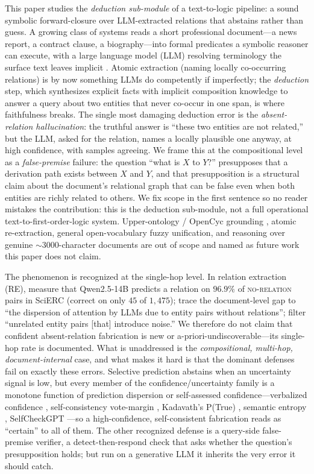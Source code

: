 \documentclass[11pt,letterpaper]{article}
\begin{document}
This paper studies the \emph{deduction sub-module} of a text-to-logic pipeline: a sound symbolic forward-closure over LLM-extracted relations that abstains rather than guess. A growing class of systems reads a short professional document---a news report, a contract clause, a biography---into formal predicates a symbolic reasoner can execute, with a large language model (LLM) resolving terminology the surface text leaves implicit \citep{Pan2023, Olausson2023}. Atomic extraction (naming locally co-occurring relations) is by now something LLMs do competently if imperfectly; the \emph{deduction} step, which synthesizes explicit facts with implicit composition knowledge to answer a query about two entities that never co-occur in one span, is where faithfulness breaks. The single most damaging deduction error is the \emph{absent-relation hallucination}: the truthful answer is ``these two entities are not related,'' but the LLM, asked for the relation, names a locally plausible one anyway, at high confidence, with samples agreeing. We frame this at the compositional level as a \emph{false-premise} failure: the question ``what is $X$ to $Y$?'' presupposes that a derivation path exists between $X$ and $Y$, and that presupposition is a structural claim about the document's relational graph that can be false even when both entities are richly related to others. We fix scope in the first sentence so no reader mistakes the contribution: this is the deduction sub-module, not a full operational text-to-first-order-logic system. Upper-ontology / OpenCyc grounding \citep{Lenat1995}, atomic re-extraction, general open-vocabulary fuzzy unification, and reasoning over genuine ${\sim}3000$-character documents are out of scope and named as future work this paper does not claim.

The phenomenon is recognized at the single-hop level. In relation extraction (RE), \citet{Yang2025DEPTH} measure that Qwen2.5-14B predicts a relation on $96.9\%$ of \textsc{no-relation} pairs in SciERC (correct on only $45$ of $1{,}475$); \citet{Li2024RelClassifier} trace the document-level gap to ``the dispersion of attention by LLMs due to entity pairs without relations''; \citet{Pi2025RelPrior} filter ``unrelated entity pairs [that] introduce noise.'' We therefore do not claim that confident absent-relation fabrication is new or a-priori-undiscoverable---its single-hop rate is documented. What is unaddressed is the \emph{compositional, multi-hop, document-internal} case, and what makes it hard is that the dominant defenses fail on exactly these errors. Selective prediction abstains when an uncertainty signal is low, but every member of the confidence/uncertainty family is a monotone function of prediction dispersion or self-assessed confidence---verbalized confidence \citep{Lin2022, Tian2023}, self-consistency vote-margin \citep{Wang2022}, Kadavath's P(True) \citep{Kadavath2022}, semantic entropy \citep{Kuhn2023, Farquhar2024}, SelfCheckGPT \citep{Manakul2023}---so a high-confidence, self-consistent fabrication reads as ``certain'' to all of them. The other recognized defense is a query-side false-premise verifier, a detect-then-respond check that asks whether the question's presupposition holds; but run on a generative LLM it inherits the very error it should catch.
\end{document}
